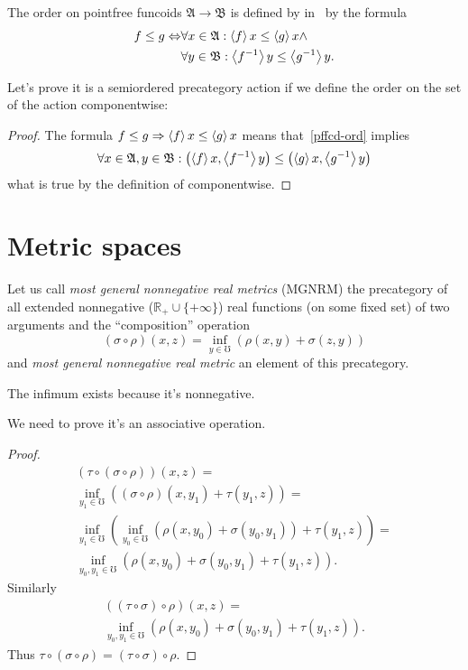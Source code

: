 The order on pointfree funcoids $\mathfrak{A}\to\mathfrak{B}$ is defined by in~\cite{volume-1} by the formula
\begin{align}\label{pffcd-ord}
f\leq g\Leftrightarrow&\forall x\in\mathfrak{A}:\left\langle f\right\rangle x\leq\left\langle g\right\rangle x\land\\\nonumber&\forall y\in\mathfrak{B}:\left\langle f^{-1}\right\rangle y\leq\left\langle g^{-1}\right\rangle y.
\end{align}

Let's prove it is a semiordered precategory action if we define the order on the set of the action componentwise:

\begin{proof}
The formula $f\leq g\Rightarrow\left\langle f\right\rangle x\leq\left\langle g\right\rangle x$ means that~\eqref{pffcd-ord} implies
\[ \forall x\in\mathfrak{A},y\in\mathfrak{B}:
\left(\left\langle f\right\rangle x,\left\langle f^{-1}\right\rangle y\right) \leq \left(\left\langle g\right\rangle x,\left\langle g^{-1}\right\rangle y\right)\]
what is true by the definition of componentwise.
\end{proof}

\chapter{Metric spaces}

Let us call \emph{most general nonnegative real metrics} (MGNRM) the precategory of all extended nonnegative ($\mathbb{R}_{+}\cup\{+\infty\}$) real functions (on some fixed set) of two arguments and the ``composition'' operation
\[ (\sigma\circ\rho)(x,z) = \inf_{y\in\mho}(\rho(x,y)+\sigma(z,y)) \]
and \emph{most general nonnegative real metric} an element of this precategory.

\begin{rem}
The infimum exists because it's nonnegative.
\end{rem}

We need to prove it's an associative operation.

\begin{proof}
\begin{multline*}
(\tau\circ(\sigma\circ\rho))(x,z) = \\
\inf_{y_1\in\mho}((\sigma\circ\rho)(x,y_1)+\tau(y_1,z)) = \\
\inf_{y_1\in\mho}(\inf_{y_0\in\mho}(\rho(x,y_0)+\sigma(y_0,y_1))+\tau(y_1,z)) = \\
\inf_{y_0,y_1\in\mho}(\rho(x,y_0)+\sigma(y_0,y_1)+\tau(y_1,z)).
\end{multline*}
Similarly 
\begin{multline*}
((\tau\circ\sigma)\circ\rho)(x,z) = \\
\inf_{y_0,y_1\in\mho}(\rho(x,y_0)+\sigma(y_0,y_1)+\tau(y_1,z)).
\end{multline*}
Thus $\tau\circ(\sigma\circ\rho)=(\tau\circ\sigma)\circ\rho$.
\end{proof}

